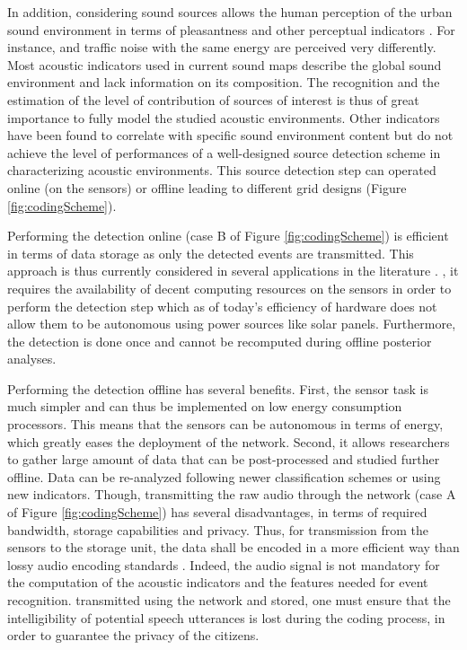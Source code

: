 \documentclass[sensors,article,accept,moreauthors,pdftex,10pt,a4paper]{mdpi}
\begin{document}
In addition, considering sound sources allows  the human perception of the urban sound environment in terms of pleasantness and other perceptual indicators \cite{lavandier2006contribution, aumond2017}. For instance,  and traffic noise with the same energy are perceived very differently. Most acoustic indicators used in current sound maps describe the global sound environment and lack information on its composition. The recognition and the estimation of the level of contribution of sources of interest is thus of great importance to fully model the studied acoustic environments. Other indicators have been found to correlate with specific sound environment content \cite{aumond2017} but do not achieve the level of performances of a well-designed source detection scheme in characterizing acoustic environments. This source detection step can operated online (on the sensors) or offline  leading to different grid designs (Figure \ref{fig:codingScheme}).

Performing the detection online (case B of Figure \ref{fig:codingScheme}) is efficient in terms of data storage as only the detected events are transmitted. This approach is thus currently considered in several applications in the literature \cite{defreville2006automatic, mydlarz2017implementation, mydlarz2015design}. , it requires the availability of decent computing resources on the sensors in order to perform the detection step which as of today's efficiency of hardware does not allow them to be autonomous using power sources like solar panels. Furthermore, the detection is done once and cannot be recomputed during offline posterior analyses.

Performing the detection offline has several benefits. First, the sensor task is much simpler and can thus be implemented on low energy consumption processors. This means that the sensors can be autonomous in terms of energy, which greatly eases the deployment of the network. Second, it allows researchers to gather large amount of data that can be post-processed and studied further offline. Data can be re-analyzed following newer classification schemes or using new indicators. Though, transmitting the raw audio  through the network (case A of Figure \ref{fig:codingScheme}) has several disadvantages, in terms of required bandwidth, storage capabilities and privacy. Thus, for transmission from the sensors to the storage unit, the data shall be encoded in a more efficient way than lossy audio encoding standards \cite{pan1995tutorial}. Indeed, the audio signal is not mandatory for the computation of the acoustic indicators and the features needed for event recognition.  transmitted using the network and stored, one must ensure that the intelligibility of potential speech utterances is lost during the coding process, in order to guarantee the privacy of the citizens.
\end{document}
